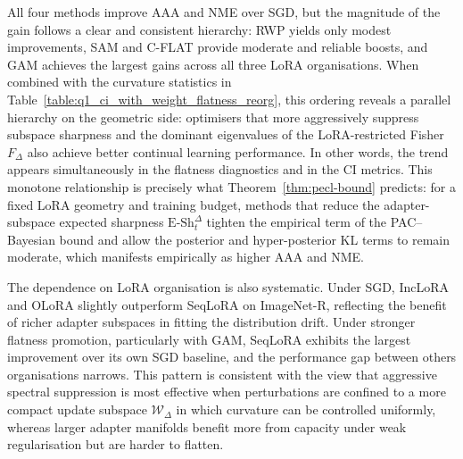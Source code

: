 \documentclass[10pt]{article} %
\begin{document}
All four methods improve AAA and NME over SGD, but the magnitude of the gain follows a clear and consistent hierarchy: RWP yields only modest improvements, SAM and C-FLAT provide moderate and reliable boosts, and GAM achieves the largest gains across all three LoRA organisations. When combined with the curvature statistics in Table~\ref{table:q1_ci_with_weight_flatness_reorg}, this ordering reveals a parallel hierarchy on the geometric side: optimisers that more aggressively suppress subspace sharpness and the dominant eigenvalues of the LoRA-restricted Fisher $F_\Delta$ also achieve better continual learning performance. In other words, the trend appears simultaneously in the flatness diagnostics and in the CI metrics. This monotone relationship is precisely what Theorem~\ref{thm:pecl-bound} predicts: for a fixed LoRA geometry and training budget, methods that reduce the adapter-subspace expected sharpness $\mathrm{E\text{-}Sh}^\Delta_t$ tighten the empirical term of the PAC–Bayesian bound and allow the posterior and hyper-posterior KL terms to remain moderate, which manifests empirically as higher AAA and NME.

The dependence on LoRA organisation is also systematic. Under SGD, IncLoRA and OLoRA slightly outperform SeqLoRA on ImageNet-R, reflecting the benefit of richer adapter subspaces in fitting the distribution drift. Under stronger flatness promotion, particularly with GAM, SeqLoRA exhibits the largest improvement over its own SGD baseline, and the performance gap between others organisations narrows. This pattern is consistent with the view that aggressive spectral suppression is most effective when perturbations are confined to a more compact update subspace $\mathcal W_\Delta$ in which curvature can be controlled uniformly, whereas larger adapter manifolds benefit more from capacity under weak regularisation but are harder to flatten.  




\end{document}
